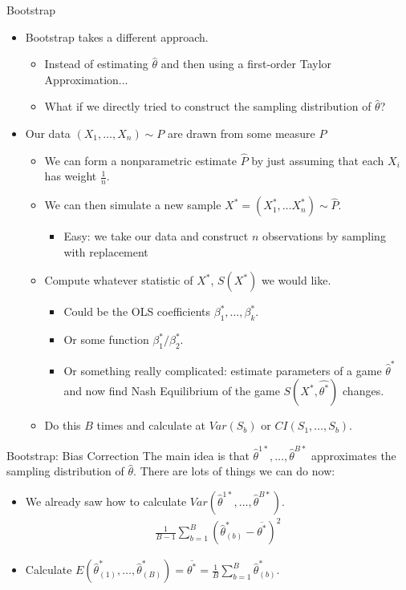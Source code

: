 \documentclass[aspectratio=169]{beamer}
\begin{document}
\begin{frame}{Bootstrap}
\begin{itemize}
\item Bootstrap takes a different approach.
\begin{itemize}
\item Instead of estimating $\hat{\theta}$ and then using a first-order Taylor Approximation...
\item What if we directly tried to construct the \alert{sampling distribution} of $\hat{\theta}$?
\end{itemize}
\item Our data $(X_1,\ldots,X_n) \sim P$ are drawn from some measure $P$
\begin{itemize}
\item We can form a \alert{nonparametric estimate} $\hat{P}$ by just assuming that each $X_i$ has weight $\frac{1}{n}$.
\item We can then simulate a new sample $X^{*} = (X_1^{*},\ldots X_n^{*}) \sim \hat{P}$.
\begin{itemize}
\item Easy: we take our data and construct $n$ observations by \alert{sampling with replacement} 
\end{itemize}
\item Compute whatever statistic of $X^{*}$, $S(X^*)$ we would like.
\begin{itemize}
\item Could be the OLS coefficients $\beta_1^{*},\ldots, \beta_k^{*}$.
\item Or some function $\beta_1^{*}/\beta_2^{*}$.
\item Or something really complicated: estimate parameters of a game $\hat{\theta}^*$ and now find Nash Equilibrium of the game $S(X^{*},\hat{\theta^*})$ changes.
\end{itemize}
\item Do this $B$ times and calculate at $Var(S_b)$ or $CI(S_1,\ldots, S_b)$.
\end{itemize}
\end{itemize}
\end{frame}


\begin{frame}{Bootstrap: Bias Correction}
\small
The main idea is that $\hat{\theta}^{1*},\ldots, \hat{\theta}^{B*}$ approximates the \alert{sampling distribution} of $\hat{\theta}$. There are lots of things we can do now:
\begin{itemize}
\item We already saw how to calculate $Var(\hat{\theta}^{1*},\ldots, \hat{\theta}^{B*})$.
\begin{eqnarray*}
\frac{1}{B-1} \sum_{b=1}^B (\hat{\theta}_{(b)}^* - \overline{\theta^{*}})^2
\end{eqnarray*}
\item Calculate $E(\hat{\theta}^{*}_{(1)},\ldots, \hat{\theta}^{*}_{(B)}) = \overline{\theta^{*}} = \frac{1}{B} \sum_{b=1}^B \hat{\theta}_{(b)}^*$.
\end{itemize}
\end{frame}
\end{document}
